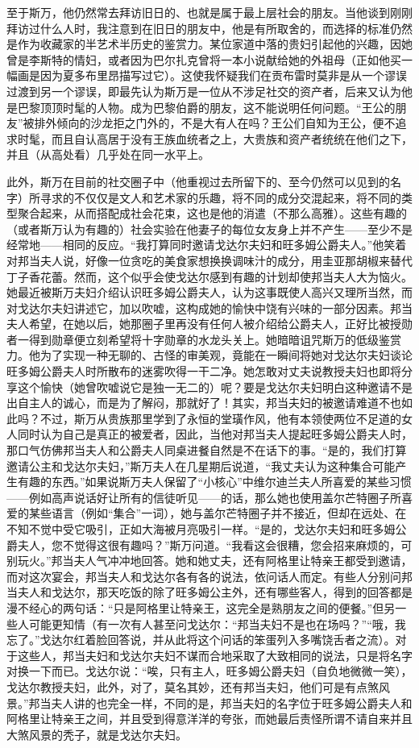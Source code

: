 \par 至于斯万，他仍然常去拜访旧日的、也就是属于最上层社会的朋友。当他谈到刚刚拜访过什么人时，我注意到在旧日的朋友中，他是有所取舍的，而选择的标准仍然是作为收藏家的半艺术半历史的鉴赏力。某位家道中落的贵妇引起他的兴趣，因她曾是李斯特的情妇，或者因为巴尔扎克曾将一本小说献给她的外祖母（正如他买一幅画是因为夏多布里昂描写过它）。这使我怀疑我们在贡布雷时莫非是从一个谬误过渡到另一个谬误，即最先认为斯万是一位从不涉足社交的资产者，后来又认为他是巴黎顶顶时髦的人物。成为巴黎伯爵的朋友，这不能说明任何问题。“王公的朋友”被排外倾向的沙龙拒之门外的，不是大有人在吗？王公们自知为王公，便不追求时髦，而且自认高居于没有王族血统者之上，大贵族和资产者统统在他们之下，并且（从高处看）几乎处在同一水平上。
\par 此外，斯万在目前的社交圈子中（他重视过去所留下的、至今仍然可以见到的名字）所寻求的不仅仅是文人和艺术家的乐趣，将不同的成分交混起来，将不同的类型聚合起来，从而搭配成社会花束，这也是他的消遣（不那么高雅）。这些有趣的（或者斯万认为有趣的）社会实验在他妻子的每位女友身上并不产生——至少不是经常地——相同的反应。“我打算同时邀请戈达尔夫妇和旺多姆公爵夫人。”他笑着对邦当夫人说，好像一位贪吃的美食家想换换调味汁的成分，用圭亚那胡椒来替代丁子香花蕾。然而，这个似乎会使戈达尔感到有趣的计划却使邦当夫人大为恼火。她最近被斯万夫妇介绍认识旺多姆公爵夫人，认为这事既使人高兴又理所当然，而对戈达尔夫妇讲述它，加以吹嘘，这构成她的愉快中饶有兴味的一部分因素。邦当夫人希望，在她以后，她那圈子里再没有任何人被介绍给公爵夫人，正好比被授勋者一得到勋章便立刻希望将十字勋章的水龙头关上。她暗暗诅咒斯万的低级鉴赏力。他为了实现一种无聊的、古怪的审美观，竟能在一瞬间将她对戈达尔夫妇谈论旺多姆公爵夫人时所散布的迷雾吹得一干二净。她怎敢对丈夫说教授夫妇也即将分享这个愉快（她曾吹嘘说它是独一无二的）呢？要是戈达尔夫妇明白这种邀请不是出自主人的诚心，而是为了解闷，那就好了！其实，邦当夫妇的被邀请难道不也如此吗？不过，斯万从贵族那里学到了永恒的堂璜作风，他有本领使两位不足道的女人同时认为自己是真正的被爱者，因此，当他对邦当夫人提起旺多姆公爵夫人时，那口气仿佛邦当夫人和公爵夫人同桌进餐自然是不在话下的事。“是的，我们打算邀请公主和戈达尔夫妇，”斯万夫人在几星期后说道，“我丈夫认为这种集合可能产生有趣的东西。”如果说斯万夫人保留了“小核心”中维尔迪兰夫人所喜爱的某些习惯——例如高声说话好让所有的信徒听见——的话，那么她也使用盖尔芒特圈子所喜爱的某些语言（例如“集合”一词），她与盖尔芒特圈子并不接近，但却在远处、在不知不觉中受它吸引，正如大海被月亮吸引一样。“是的，戈达尔夫妇和旺多姆公爵夫人，您不觉得这很有趣吗？”斯万问道。“我看这会很糟，您会招来麻烦的，可别玩火。”邦当夫人气冲冲地回答。她和她丈夫，还有阿格里让特亲王都受到邀请，而对这次宴会，邦当夫人和戈达尔各有各的说法，依问话人而定。有些人分别问邦当夫人和戈达尔，那天吃饭的除了旺多姆公主外，还有哪些客人，得到的回答都是漫不经心的两句话：“只是阿格里让特亲王，这完全是熟朋友之间的便餐。”但另一些人可能更知情（有一次有人甚至问戈达尔：“邦当夫妇不是也在场吗？”“哦，我忘了。”戈达尔红着脸回答说，并从此将这个问话的笨蛋列入多嘴饶舌者之流）。对于这些人，邦当夫妇和戈达尔夫妇不谋而合地采取了大致相同的说法，只是将名字对换一下而已。戈达尔说：“唉，只有主人，旺多姆公爵夫妇（自负地微微一笑），戈达尔教授夫妇，此外，对了，莫名其妙，还有邦当夫妇，他们可是有点煞风景。”邦当夫人讲的也完全一样，不同的是，邦当夫妇的名字位于旺多姆公爵夫人和阿格里让特亲王之间，并且受到得意洋洋的夸张，而她最后责怪所谓不请自来并且大煞风景的秃子，就是戈达尔夫妇。
